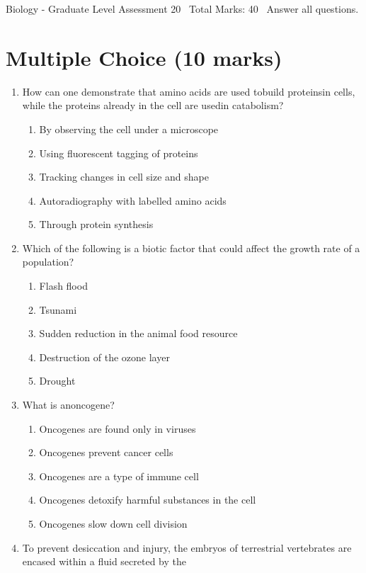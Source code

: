 \documentclass[12pt]{article}
\begin{document}
\begin{center}
Biology - Graduate Level Assessment 20 \
Total Marks: 40 \
Answer all questions.
\end{center}

\section*{Multiple Choice (10 marks)}
\begin{enumerate}[label=\arabic*.]
\item How can one demonstrate that amino acids are used tobuild proteinsin cells, while the proteins already in the cell are usedin catabolism?
\begin{enumerate}[label=(\alph*)]
    \item By observing the cell under a microscope
    \item Using fluorescent tagging of proteins
    \item Tracking changes in cell size and shape
    \item Autoradiography with labelled amino acids
    \item Through protein synthesis
\end{enumerate}
\item Which of the following is a biotic factor that could affect the growth rate of a population?
\begin{enumerate}[label=(\alph*)]
    \item Flash flood
    \item Tsunami
    \item Sudden reduction in the animal food resource
    \item Destruction of the ozone layer
    \item Drought
\end{enumerate}
\item What is anoncogene?
\begin{enumerate}[label=(\alph*)]
    \item Oncogenes are found only in viruses
    \item Oncogenes prevent cancer cells
    \item Oncogenes are a type of immune cell
    \item Oncogenes detoxify harmful substances in the cell
    \item Oncogenes slow down cell division
\end{enumerate}
\item To prevent desiccation and injury, the embryos of terrestrial vertebrates are encased within a fluid secreted by the

\end{enumerate}
\end{document}

